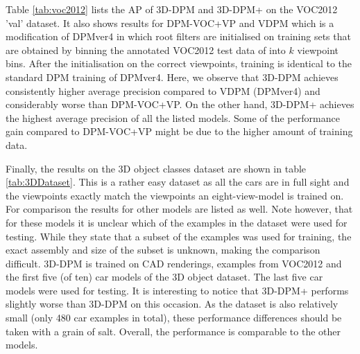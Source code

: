 Table \ref{tab:voc2012} lists the AP of 3D-DPM and 3D-DPM+ on the VOC2012 'val' dataset. It also shows results for DPM-VOC+VP \cite{Pepik:2012aa} and VDPM which is a modification of DPMver4 in which root filters are initialised on training sets that are obtained by binning the annotated VOC2012 test data of \cite{xiang_wacv14} into $k$ viewpoint bins. After the initialisation on the correct viewpoints, training is identical to the standard DPM training of DPMver4. Here, we observe that 3D-DPM achieves consistently higher average precision compared to VDPM (DPMver4) and considerably worse than DPM-VOC+VP. On the other hand, 3D-DPM+ achieves the highest average precision of all the listed models. Some of the performance gain compared to DPM-VOC+VP might be due to the higher amount of training data.

\begin{table}[]
\caption{Average precision and viewpoint estimation in MPPE on cars of the 3D Object classes dataset \cite{4408987}.}	\label{tab:3DDataset}
\end{table}

Finally, the results on the 3D object classes dataset \cite{4408987} are shown in table \ref{tab:3DDataset}. This is a rather easy dataset as all the cars are in full sight and the viewpoints exactly match the viewpoints an eight-view-model is trained on. For comparison the results for other models are listed as well. Note however, that for these models it is unclear which of the examples in the dataset were used for testing. While they state that a subset of the examples was used for training, the exact assembly and size of the subset is unknown, making the comparison difficult. 3D-DPM is trained on CAD renderings, examples from VOC2012 and the first five (of ten) car models of the 3D object dataset. The last five car models were used for testing. It is interesting to notice that 3D-DPM+ performs slightly worse than 3D-DPM on this occasion. As the dataset is also relatively small (only 480 car examples in total), these performance differences should be taken with a grain of salt. Overall, the performance is comparable to the other models.

